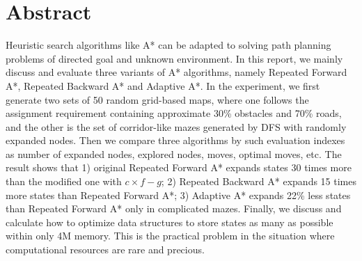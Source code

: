 \section*{Abstract}

Heuristic search algorithms like A* can be adapted to solving path planning
problems of directed goal and unknown environment. In this report, we mainly
discuss and evaluate three variants of A* algorithms, namely Repeated Forward
A*, Repeated Backward A* and Adaptive A*. In the experiment, we first generate
two sets of 50 random grid-based maps, where one follows the assignment
requirement containing approximate 30\% obstacles and 70\% roads, and the other
is the set of corridor-like mazes generated by DFS with randomly expanded
nodes.  Then we compare three algorithms by such evaluation indexes as number
of expanded nodes, explored nodes, moves, optimal moves, etc. The result shows
that 1) original Repeated Forward A* expands states 30 times more than the
modified one with $c\times f-g$; 2) Repeated Backward A* expands 15 times more
states than Repeated Forward A*; 3) Adaptive A* expands 22\% less states than
Repeated Forward A* only in complicated mazes. Finally, we discuss and calculate
how to optimize data structures to store states as many as possible within only
4M memory. This is the practical problem in the situation where computational
resources are rare and precious.
